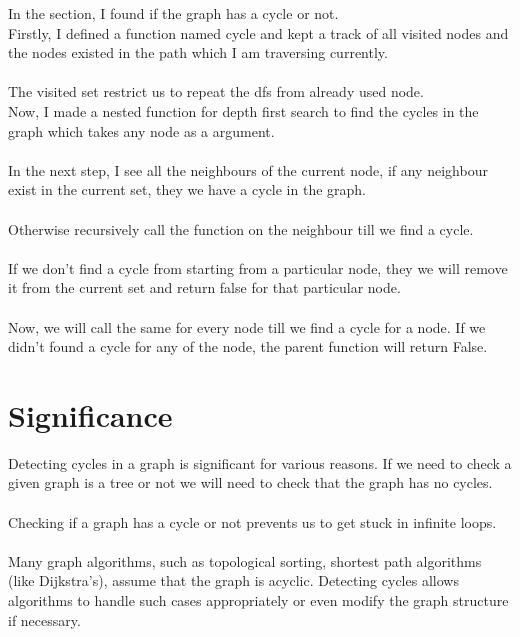\documentclass{article}
\begin{document}
In the section, I found if the graph has a cycle or not. \\
Firstly, I defined a function named cycle and kept a track of all visited nodes and the nodes existed in the path which I am traversing currently. \\\\The visited set restrict us to repeat the dfs from already used node.\\
Now, I made a nested function for depth first search to find the cycles in the graph which takes any node as a argument. \\\\
In the next step, I see all the neighbours of the current node, if any neighbour exist in the current set, they we have a cycle in the graph. \\\\Otherwise recursively call the function on the neighbour till we find a cycle.\\\\
If we don't find a cycle from starting from a particular node, they we will remove it from the current set and return false for that particular node.\\\\
Now, we will call the same for every node till we find a cycle for a node. If we didn't found a cycle for any of the node, the parent function will return False.
\section{Significance}
Detecting cycles in a graph is significant for various reasons. If we need to check a given graph is a tree or not we will need to check that the graph has no cycles.\\\\
Checking if a graph has a cycle or not prevents us to get stuck in infinite loops.\\\\
Many graph algorithms, such as topological sorting, shortest path algorithms (like Dijkstra's), assume that the graph is acyclic. Detecting cycles allows algorithms to handle such cases appropriately or even modify the graph structure if necessary. 
\end{document}
